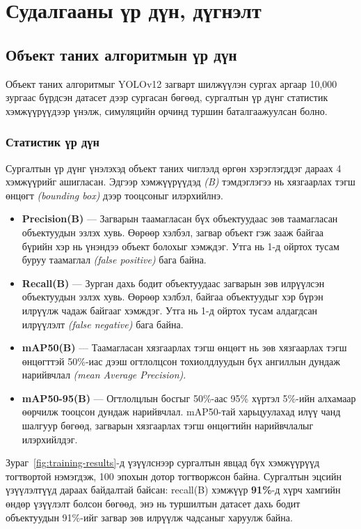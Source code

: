 \chapter{Судалгааны үр дүн, дүгнэлт}
\label{ch:results}

\section{Объект таних алгоритмын үр дүн}

Объект таних алгоритмыг YOLOv12 загварт шилжүүлэн сургах аргаар 10,000 зургаас бүрдсэн датасет дээр сургасан бөгөөд, сургалтын үр дүнг статистик хэмжүүрүүдээр үнэлж, симуляцийн орчинд туршин баталгаажуулсан болно.

\subsection{Статистик үр дүн}

Сургалтын үр дүнг үнэлэхэд объект таних чиглэлд өргөн хэрэглэгддэг дараах 4 хэмжүүрийг ашигласан. Эдгээр хэмжүүрүүдэд \textit{(B)} тэмдэглэгээ нь хязгаарлах тэгш өнцөгт \textit{(bounding box)} дээр тооцсоныг илэрхийлнэ.

\begin{itemize}
    \item \textbf{Precision(B)} --- Загварын таамагласан бүх объектуудаас зөв таамагласан объектуудын эзлэх хувь. Өөрөөр хэлбэл, загвар объект гэж зааж байгаа бүрийн хэр нь үнэндээ объект болохыг хэмждэг. Утга нь 1-д ойртох тусам буруу таамаглал \textit{(false positive)} бага байна.
    \item \textbf{Recall(B)} --- Зурган дахь бодит объектуудаас загварын зөв илрүүлсэн объектуудын эзлэх хувь. Өөрөөр хэлбэл, байгаа объектуудыг хэр бүрэн илрүүлж чадаж байгааг хэмждэг. Утга нь 1-д ойртох тусам алдагдсан илрүүлэлт \textit{(false negative)} бага байна.
    \item \textbf{mAP50(B)} --- Таамагласан хязгаарлах тэгш өнцөгт нь зөв хязгаарлах тэгш өнцөгттэй 50\%-иас дээш огтлолцсон тохиолдлуудын бүх ангиллын дундаж нарийвчлал \textit{(mean Average Precision)}.
    \item \textbf{mAP50-95(B)} --- Огтлолцлын босгыг 50\%-аас 95\% хүртэл 5\%-ийн алхамаар өөрчилж тооцсон дундаж нарийвчлал. mAP50-тай харьцуулахад илүү чанд шалгуур бөгөөд, загварын хязгаарлах тэгш өнцөгтийн нарийвчлалыг илэрхийлдэг.
\end{itemize}

Зураг~\ref{fig:training-results}-д үзүүлснээр сургалтын явцад бүх хэмжүүрүүд тогтвортой нэмэгдэж, 100 эпохын дотор тогтворжсон байна. Сургалтын эцсийн үзүүлэлтүүд дараах байдалтай байсан: recall(B) хэмжүүр \textbf{91\%}-д хүрч хамгийн өндөр үзүүлэлт болсон бөгөөд, энэ нь туршилтын датасет дахь бодит объектуудын 91\%-ийг загвар зөв илрүүлж чадсаныг харуулж байна.

